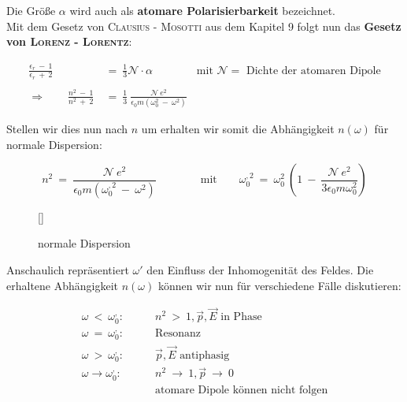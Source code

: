 Die Größe $\alpha$ wird auch als \textbf{atomare Polarisierbarkeit} bezeichnet.\\
Mit dem Gesetz von \textsc{Clausius - Mosotti} aus dem Kapitel 9 folgt nun das \textbf{Gesetz von \textsc{Lorenz - Lorentz}}:

\begin{align*}
\frac{\epsilon_r \ - \ 1}{\epsilon_r \ + \ 2} \ &= \ \frac{1}{3} \mathcal{N} \cdot \alpha \qquad\qquad \text{mit }\mathcal{N}= \text{ Dichte der atomaren Dipole}\\
\ \\
\Rightarrow\qquad \frac{n^2 \ - \ 1}{n^2 \ + \ 2} \ &= \ \frac{1}{3} \ \frac{\mathcal{N} \ e^2}{\epsilon_0 m \left(\omega_0^2 \ - \ \omega^2\right)}
\end{align*}

Stellen wir dies nun nach $n$ um erhalten wir somit die Abhängigkeit $n(\omega)$ für normale Dispersion:

\begin{equation*}
n^2 \ = \ \frac{\mathcal{N} \ e^2}{\epsilon_0 m \left(\omega_0^{,2} \ - \ \omega^2\right)} \qquad \qquad \text{mit} \qquad \omega_0^{,2} \ = \ \omega_0^2\ \left(1 \ - \ \frac{\mathcal{N} \ e^2}{3 \epsilon_0 m \omega_0^2}\right)
\end{equation*}

\begin{wrapfigure}[9]{r}[0cm]{0cm}
	\raisebox{0pt}[\dimexpr{}\baselineskip\relax]{
		\colorbox{hgrey}{
		}
	}
	\caption{normale Dispersion}
\end{wrapfigure}

Anschaulich repräsentiert $\omega'$ den Einfluss der Inhomogenität des Feldes. Die erhaltene Abhängigkeit $n(\omega)$ können wir nun für verschiedene Fälle diskutieren:

\begin{align*}
\omega \ < \ \omega^{,}_0:& \qquad n^2 \ > \ 1, \vec{p},\vec{E} \text{ in Phase}\\
\omega \ = \ \omega^{,}_0:& \qquad \text{Resonanz}\\
\omega \ > \ \omega^{,}_0:& \qquad \vec{p},\vec{E} \text{ antiphasig}\\
\omega \rightarrow \omega^{,}_0:& \qquad n^2 \ \rightarrow \ 1, \vec{p} \ \rightarrow \ 0 \\
&\qquad\text{atomare Dipole können nicht  folgen}
\end{align*}

